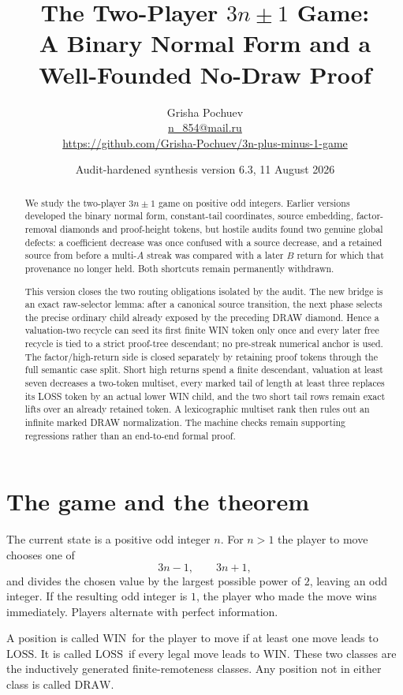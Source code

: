 \documentclass[11pt]{article}
\title{The Two-Player $3n\mathbin{\pm}1$ Game:\\
A Binary Normal Form and a Well-Founded No-Draw Proof}
\author{Grisha Pochuev\\
  \small\href{mailto:n_854@mail.ru}{n\_854@mail.ru}\\
  \small\url{https://github.com/Grisha-Pochuev/3n-plus-minus-1-game}}
\date{Audit-hardened synthesis version 6.3, 11 August 2026}
\newcommand{\WIN}{\ensuremath{\mathrm{WIN}}}
\newcommand{\LOSS}{\ensuremath{\mathrm{LOSS}}}
\newcommand{\DRAW}{\ensuremath{\mathrm{DRAW}}}
\begin{document}
\maketitle

\begin{abstract}
We study the two-player $3n\pm1$ game on positive odd integers. Earlier
versions developed the binary normal form, constant-tail coordinates, source
embedding, factor-removal diamonds and proof-height tokens, but hostile audits
found two genuine global defects: a coefficient decrease was once confused
with a source decrease, and a retained source from before a multi-$A$ streak
was compared with a later $B$ return for which that provenance no longer held.
Both shortcuts remain permanently withdrawn.

This version closes the two routing obligations isolated by the audit.  The
new bridge is an exact raw-selector lemma: after a canonical source transition,
the next phase selects the precise ordinary child already exposed by the
preceding DRAW diamond.  Hence a valuation-two recycle can seed its first
finite WIN token only once and every later free recycle is tied to a strict
proof-tree descendant; no pre-streak numerical anchor is used.  The
factor/high-return side is closed separately by retaining proof tokens through
the full semantic case split.  Short high returns spend a finite descendant,
valuation at least seven decreases a two-token multiset, every marked tail of
length at least three replaces its LOSS token by an actual lower WIN child,
and the two short tail rows remain exact lifts over an already retained token.
A lexicographic multiset rank then rules out an infinite marked DRAW
normalization.  The machine checks remain supporting regressions rather than an
end-to-end formal proof.
\end{abstract}

\tableofcontents

\section{The game and the theorem}

The current state is a positive odd integer $n$. For $n>1$ the player to move
chooses one of
\[
  3n-1,\qquad 3n+1,
\]
and divides the chosen value by the largest possible power of $2$, leaving an
odd integer. If the resulting odd integer is $1$, the player who made the move
wins immediately. Players alternate with perfect information.

A position is called \WIN\ for the player to move if at least one move leads to
\LOSS. It is called \LOSS\ if every legal move leads to \WIN. These two classes
are the inductively generated finite-remoteness classes. Any position not in
either class is called \DRAW.
\end{document}
